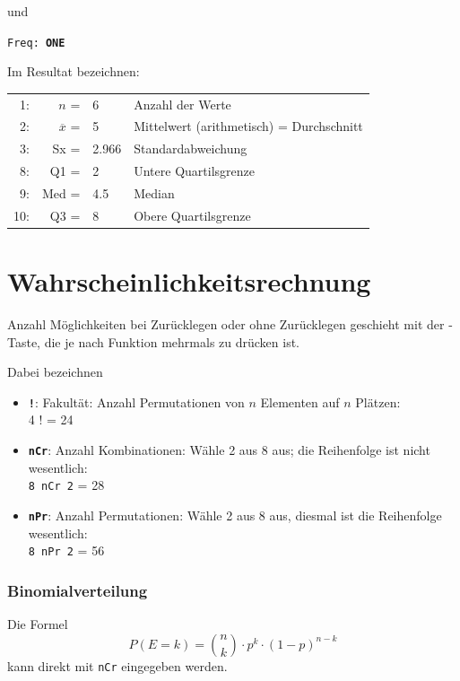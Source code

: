 und

\texttt{Freq: \textbf{ONE}}

Im Resultat bezeichnen:

\begin{tabular}{r|r l|p{9cm}}
 1: & $n$            = & 6     & Anzahl der Werte\\
 2: & $\overline{x}$ = & 5     & Mittelwert (arithmetisch) = Durchschnitt\\
 3: & Sx             = & 2.966 & Standardabweichung \\
 8: & Q1             = & 2     & Untere Quartilsgrenze \\
 9: & Med            = & 4.5   & Median \\
10: & Q3             = & 8     & Obere Quartilsgrenze \\


\end{tabular}
\newpage

\section{Wahrscheinlichkeitsrechnung}\label{wahrscheinlichkeitsrechnung}
Anzahl Möglichkeiten bei Zurücklegen oder ohne Zurücklegen geschieht mit der -Taste, die je nach Funktion mehrmals zu drücken ist. 

Dabei bezeichnen

\begin{itemize}
\item \texttt{\textbf{!}}: Fakultät: Anzahl Permutationen von $n$ Elementen auf $n$ Plätzen:\\
4 ! = 24

\item \texttt{\textbf{nCr}}: Anzahl Kombinationen: Wähle 2 aus 8 aus; die Reihenfolge ist nicht wesentlich:\\
\texttt{8 nCr 2} = 28

\item \texttt{\textbf{nPr}}: Anzahl Permutationen: Wähle 2 aus 8 aus, diesmal ist die Reihenfolge wesentlich:\\
\texttt{8 nPr 2} = 56
\end{itemize}

\subsubsection{Binomialverteilung}
Die Formel
$$P(E = k) = {n \choose k}\cdot{}p^k\cdot{}(1-p)^{n-k}$$
kann direkt mit \texttt{nCr} eingegeben werden.

